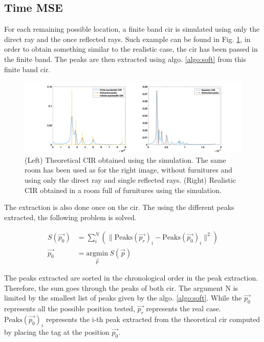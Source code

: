 \subsection{Time MSE}

For each remaining possible location, a finite band \gls{cir} is simulated using only the direct ray and the once reflected rays. Such example can be found in Fig. \ref{fig:soft_simu}, in order to obtain something similar to the realistic case, the \gls{cir} has been passed in the finite band. The peaks are then extracted using algo. \ref{algo:soft} from this finite band \gls{cir}.

\begin{figure}[H]
\centering
\includegraphics[width=\linewidth]{Images/inf_vs_fin.png}
\caption{(Left) Theoretical CIR obtained using the simulation. The same room has been used as for the right image, without furnitures and using only the direct ray and single reflected rays.  (Right) Realistic CIR obtained in a room full of furnitures using the simulation.\label{fig:soft_simu}}
\end{figure}

The extraction is also done once on the \gls{cir}. The using the different peaks extracted, the following problem is solved. 

\begin{equation}
\label{eq:mse_time}
\begin{aligned}
S(\vec{p_0}) &= \sum_i^N (\|\text{Peaks}(\vec{p_{r}})_i - \text{Peaks}(\vec{p_{0}})_i\| ^2 ) \\
\vec{p_0} &= \underset{\vec{p}}{\text{argmin}}~ S(\vec{p})
\end{aligned}
\end{equation}

The peaks extracted are sorted in the chronological order in the peak extraction. Therefore, the sum goes through the peaks of both \gls{cir}. The argument $\text{N}$ is limited by the smallest list of peaks given by the algo. \ref{algo:soft}. While the $\vec{p_0}$ represents all the possible position tested, $\vec{p_r}$ represents the real case. $\text{Peaks}(\vec{p_0})_i$ represents the i-th peak extracted from the theoretical \gls{cir} computed by placing the tag at the position $\vec{p_0}$.
\vspace{2mm}

